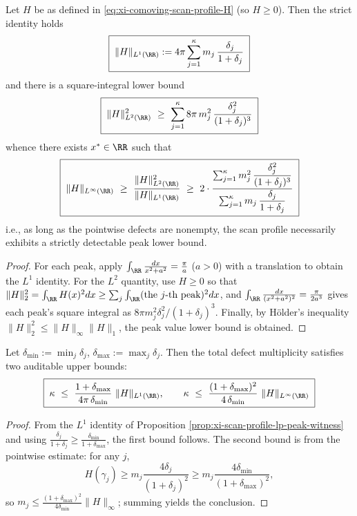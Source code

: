 \begin{proposition}\label{prop:xi-scan-profile-lp-peak-witness}
Let \(H\) be as defined in \eqref{eq:xi-comoving-scan-profile-H} (so \(H\ge 0\)).
Then the strict identity holds
\[
\boxed{\;
\|H\|_{L^1(\RR)}
:=
4\pi\sum_{j=1}^{\kappa}m_j\,\frac{\delta_j}{1+\delta_j}\;}
\]
and there is a square-integral lower bound
\[
\boxed{\;
\|H\|_{L^2(\RR)}^2
\ \ge\
\sum_{j=1}^{\kappa}8\pi\,m_j^{2}\,\frac{\delta_j^{2}}{(1+\delta_j)^{3}}\;}
\]
whence there exists \(x^\ast\in\RR\) such that
\[
\boxed{\;
\|H\|_{L^\infty(\RR)}
\ \ge\
\frac{\|H\|_{L^2(\RR)}^2}{\|H\|_{L^1(\RR)}}
\ \ge\
2\cdot
\frac{\sum_{j=1}^{\kappa} m_j^2\,\dfrac{\delta_j^2}{(1+\delta_j)^3}}
{\sum_{j=1}^{\kappa} m_j\,\dfrac{\delta_j}{1+\delta_j}}\;}
\]
i.e., as long as the pointwise defects are nonempty, the scan profile necessarily exhibits a strictly detectable peak lower bound.
\end{proposition}

\begin{proof}
For each peak, apply \(\int_{\RR}\frac{dx}{x^2+a^2}=\frac{\pi}{a}\) (\(a>0\)) with a translation to obtain the \(L^1\) identity.
For the \(L^2\) quantity, use \(H\ge0\) so that
\(
\|H\|_2^2=\int_{\RR}H(x)^2dx\ge \sum_{j}\int_{\RR}(\text{the }j\text{-th peak})^2dx
\),
and
\(
\int_{\RR}\frac{dx}{(x^2+a^2)^2}=\frac{\pi}{2a^3}
\)
gives each peak's square integral as \(8\pi m_j^2 \delta_j^2/(1+\delta_j)^3\).
Finally, by H\"older's inequality \(\|H\|_2^2\le \|H\|_\infty\|H\|_1\), the peak value lower bound is obtained. \qedhere
\end{proof}

\begin{corollary}\label{cor:xi-scan-defect-degree-bounded-by-mass-peak}
Let \(\delta_{\min}:=\min_j\delta_j\), \(\delta_{\max}:=\max_j\delta_j\).
Then the total defect multiplicity satisfies two auditable upper bounds:
\[
\boxed{\;
\kappa\ \le\ \frac{1+\delta_{\max}}{4\pi\,\delta_{\min}}\ \|H\|_{L^1(\RR)},\qquad
\kappa\ \le\ \frac{(1+\delta_{\max})^{2}}{4\,\delta_{\min}}\ \|H\|_{L^\infty(\RR)}\;}
\]
\end{corollary}

\begin{proof}
From the \(L^1\) identity of Proposition \ref{prop:xi-scan-profile-lp-peak-witness} and using
\(
\frac{\delta_j}{1+\delta_j}\ge\frac{\delta_{\min}}{1+\delta_{\max}}
\),
the first bound follows.
The second bound is from the pointwise estimate: for any \(j\),
\[
H(\gamma_j)\ge m_j\frac{4\delta_j}{(1+\delta_j)^2}\ge m_j\frac{4\delta_{\min}}{(1+\delta_{\max})^2},
\]
so \(m_j\le \frac{(1+\delta_{\max})^2}{4\delta_{\min}}\|H\|_\infty\); summing yields the conclusion. \qedhere
\end{proof}

